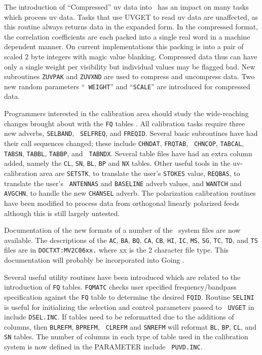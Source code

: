    The introduction of ``Compressed'' uv data into \AIPS\ has an
impact on many tasks which process uv data.  Tasks that use UVGET to
read uv data are unaffected, as this routine always returns data in the
expanded form.  In the compressed format, the correlation coefficients
are each packed into a single real word in a machine dependent manner.
On current implementations this packing is into a pair of scaled 2 byte
integers with magic value blanking.  Compressed data thus can have only
a single weight per visibility but individual values may be flagged
bad.  New subroutines {\tt ZUVPAK} and {\tt ZUVXND} are used
to compress and uncompress data.  Two new random parameters ``{\tt
WEIGHT}'' and ``{\tt SCALE}'' are introduced for compressed data.

     Programmers interested in the calibration area should study the
wide-reaching changes brought about with the {\tt FQ} tables .  All
calibration tasks require three new adverbs, {\tt SELBAND}, {\tt
SELFREQ}, and {\tt FREQID}.  Several basic subroutines have had their
call sequences changed; these include {\tt CHNDAT}, {\tt FRQTAB}, {\tt
CHNCOP}, {\tt TABCAL}, {\tt TABSN}, {\tt TABBL}, {\tt TABBP}, and {\tt
TABNDX}.  Several table files have had an extra column added, namely
the {\tt CL}, {\tt SN}, {\tt BL}, {\tt BP} and {\tt NX} tables.  Other useful
tools in the uv-calibration area are {\tt SETSTK}, to translate the
user's {\tt STOKES} value, {\tt REQBAS}, to translate the user's {\tt
ANTENNAS} and {\tt BASELINE} adverb values, and {\tt WANTCH} and {\tt
AVGCHN}, to handle the new {\tt CHANSEL} adverb.  The polarization
calibration routines have been modified to process data from
orthogonal linearly polarized feeds although this is still largely
untested.

     Documentation of the new formats of a number of the \AIPS\ system
files are now available.  The descriptions of the {\tt AC}, {\tt BA},
{\tt BQ}, {\tt CA}, {\tt CB}, {\tt HI}, {\tt IC}, {\tt MS}, {\tt SG},
{\tt TC}, {\tt TD}, and {\tt TS} files are in {\tt DOCTXT:MV2C06xx.}
where xx is the 2 character file type.  This documentation will
probably be incorporated into Going \AIPS .

     Several useful utility routines have been introduced which are
related to the introduction of {\tt FQ} tables.  {\tt FQMATC} checks user
specified frequency/bandpass specification against the {\tt FQ} table
to determine the desired {\tt FQID}.  Routine {\tt SELINI} is useful
for initializing the selection and control parameters passed to {\tt
UVGET} in include {\tt DSEL.INC}.  If tables need to be reformatted
due to the additions of columns, then {\tt BLREFM}, {\tt BPREFM}, {\tt
CLREFM} and {\tt SNREFM} will reformat {\tt BL}, {\tt BP}, {\tt CL},
and {\tt SN} tables.  The number of columns in each type of table used
in the calibration system is now defined in the PARAMETER include {\tt
PUVD.INC}.

